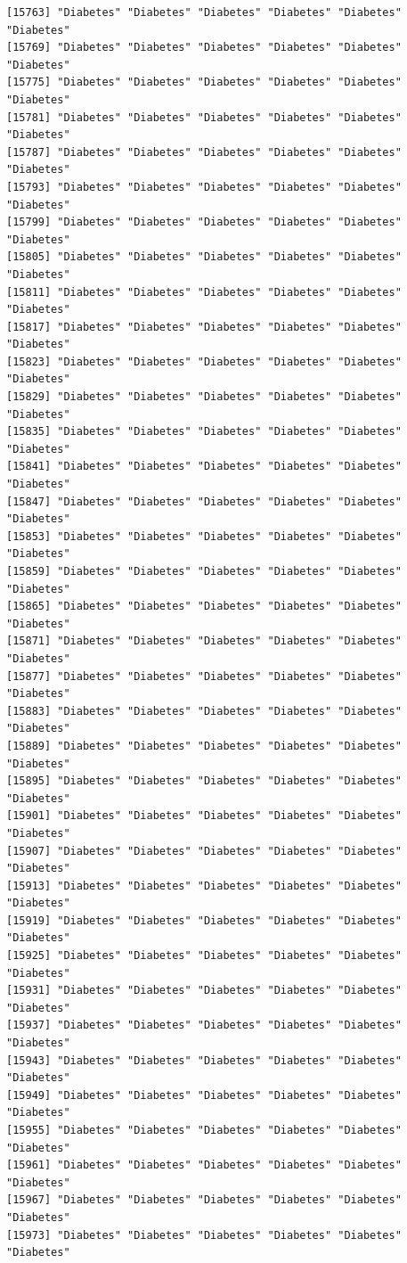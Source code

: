 \documentclass[
  letterpaper,
  DIV=11,
  numbers=noendperiod]{scrartcl}
\begin{document}
\begin{verbatim}
[15763] "Diabetes" "Diabetes" "Diabetes" "Diabetes" "Diabetes" "Diabetes"
[15769] "Diabetes" "Diabetes" "Diabetes" "Diabetes" "Diabetes" "Diabetes"
[15775] "Diabetes" "Diabetes" "Diabetes" "Diabetes" "Diabetes" "Diabetes"
[15781] "Diabetes" "Diabetes" "Diabetes" "Diabetes" "Diabetes" "Diabetes"
[15787] "Diabetes" "Diabetes" "Diabetes" "Diabetes" "Diabetes" "Diabetes"
[15793] "Diabetes" "Diabetes" "Diabetes" "Diabetes" "Diabetes" "Diabetes"
[15799] "Diabetes" "Diabetes" "Diabetes" "Diabetes" "Diabetes" "Diabetes"
[15805] "Diabetes" "Diabetes" "Diabetes" "Diabetes" "Diabetes" "Diabetes"
[15811] "Diabetes" "Diabetes" "Diabetes" "Diabetes" "Diabetes" "Diabetes"
[15817] "Diabetes" "Diabetes" "Diabetes" "Diabetes" "Diabetes" "Diabetes"
[15823] "Diabetes" "Diabetes" "Diabetes" "Diabetes" "Diabetes" "Diabetes"
[15829] "Diabetes" "Diabetes" "Diabetes" "Diabetes" "Diabetes" "Diabetes"
[15835] "Diabetes" "Diabetes" "Diabetes" "Diabetes" "Diabetes" "Diabetes"
[15841] "Diabetes" "Diabetes" "Diabetes" "Diabetes" "Diabetes" "Diabetes"
[15847] "Diabetes" "Diabetes" "Diabetes" "Diabetes" "Diabetes" "Diabetes"
[15853] "Diabetes" "Diabetes" "Diabetes" "Diabetes" "Diabetes" "Diabetes"
[15859] "Diabetes" "Diabetes" "Diabetes" "Diabetes" "Diabetes" "Diabetes"
[15865] "Diabetes" "Diabetes" "Diabetes" "Diabetes" "Diabetes" "Diabetes"
[15871] "Diabetes" "Diabetes" "Diabetes" "Diabetes" "Diabetes" "Diabetes"
[15877] "Diabetes" "Diabetes" "Diabetes" "Diabetes" "Diabetes" "Diabetes"
[15883] "Diabetes" "Diabetes" "Diabetes" "Diabetes" "Diabetes" "Diabetes"
[15889] "Diabetes" "Diabetes" "Diabetes" "Diabetes" "Diabetes" "Diabetes"
[15895] "Diabetes" "Diabetes" "Diabetes" "Diabetes" "Diabetes" "Diabetes"
[15901] "Diabetes" "Diabetes" "Diabetes" "Diabetes" "Diabetes" "Diabetes"
[15907] "Diabetes" "Diabetes" "Diabetes" "Diabetes" "Diabetes" "Diabetes"
[15913] "Diabetes" "Diabetes" "Diabetes" "Diabetes" "Diabetes" "Diabetes"
[15919] "Diabetes" "Diabetes" "Diabetes" "Diabetes" "Diabetes" "Diabetes"
[15925] "Diabetes" "Diabetes" "Diabetes" "Diabetes" "Diabetes" "Diabetes"
[15931] "Diabetes" "Diabetes" "Diabetes" "Diabetes" "Diabetes" "Diabetes"
[15937] "Diabetes" "Diabetes" "Diabetes" "Diabetes" "Diabetes" "Diabetes"
[15943] "Diabetes" "Diabetes" "Diabetes" "Diabetes" "Diabetes" "Diabetes"
[15949] "Diabetes" "Diabetes" "Diabetes" "Diabetes" "Diabetes" "Diabetes"
[15955] "Diabetes" "Diabetes" "Diabetes" "Diabetes" "Diabetes" "Diabetes"
[15961] "Diabetes" "Diabetes" "Diabetes" "Diabetes" "Diabetes" "Diabetes"
[15967] "Diabetes" "Diabetes" "Diabetes" "Diabetes" "Diabetes" "Diabetes"
[15973] "Diabetes" "Diabetes" "Diabetes" "Diabetes" "Diabetes" "Diabetes"

\end{verbatim}
\end{document}
